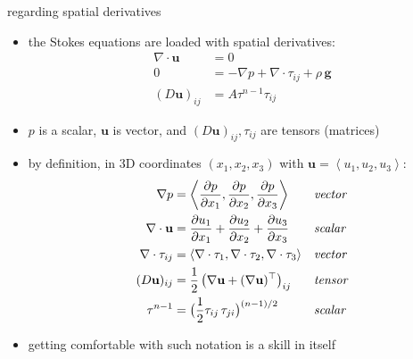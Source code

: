 \documentclass[10pt,dvipsnames]{beamer}
\newcommand{\bu}{\mathbf{u}}
\newcommand{\grad}{\nabla}
\begin{document}
\begin{frame}{regarding spatial derivatives}

\begin{itemize}
\item the Stokes equations are loaded with spatial derivatives:
{\small
\begin{align*}
\nabla \cdot \bu &= 0 \\
0 &= - \nabla p + \nabla \cdot \tau_{ij} + \rho\, \bm{g} \\
(D\bu)_{ij} &= A \tau^{n-1} \tau_{ij}
\end{align*}
}
\item $p$ is a scalar, $\bu$ is vector, and $(D\bu)_{ij},\tau_{ij}$ are tensors (matrices)
\item by definition, in 3D coordinates $(x_1,x_2,x_3)$ with $\bu=\left<u_1,u_2,u_3\right>$:
\begin{align*}
\nabla p &= \left<\frac{\partial p}{\partial x_1}, \frac{\partial p}{\partial x_2}, \frac{\partial p}{\partial x_3}\right> &&\text{\emph{vector}} \\
\nabla \cdot \bu &= \frac{\partial u_1}{\partial x_1} + \frac{\partial u_2}{\partial x_2} + \frac{\partial u_3}{\partial x_3} &&\text{\emph{scalar}} \\
\nabla \cdot \tau_{ij} &= \left<\nabla \cdot \tau_{1}, \nabla \cdot \tau_{2}, \nabla \cdot \tau_{3}\right> &&\text{\emph{vector}} \\
(D\bu)_{ij} &= \frac{1}{2}\left(\grad \bu + (\grad \bu)^\top\right)_{ij} &&\text{\emph{tensor}} \\
\tau^{n-1} &= \big(\frac{1}{2}\tau_{ij}\,\tau_{ji}\big)^{(n-1)/2} &&\text{\emph{scalar}}
\end{align*}
\item getting comfortable with such notation is a skill in itself
\end{itemize}
\end{frame}
\end{document}
